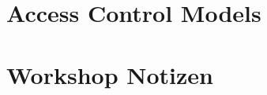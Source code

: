 \documentclass[a4paper]{report}
\begin{document}


\tableofcontents
\newpage

\chapter{Access Control Models}



\chapter{Workshop Notizen}


\listoffigures
\printglossary[style=altlist,title=Glossar]
\end{document}
